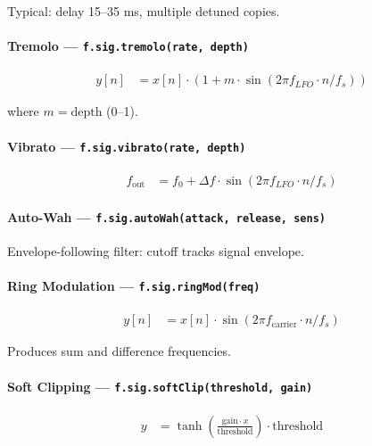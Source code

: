 Typical: delay 15--35 ms, multiple detuned copies.

\paragraph{Tremolo --- \texttt{f.sig.tremolo(rate, depth)}}

\begin{align}
y[n] &= x[n] \cdot (1 + m \cdot \sin(2\pi f_{LFO} \cdot n / f_s)) \label{eq:sig-tremolo}
\end{align}

where $m = \text{depth}$ (0--1).

\paragraph{Vibrato --- \texttt{f.sig.vibrato(rate, depth)}}

\begin{align}
f_{\text{out}} &= f_0 + \Delta f \cdot \sin(2\pi f_{LFO} \cdot n / f_s) \label{eq:sig-vibrato}
\end{align}

\paragraph{Auto-Wah --- \texttt{f.sig.autoWah(attack, release, sens)}}
Envelope-following filter: cutoff tracks signal envelope.

\paragraph{Ring Modulation --- \texttt{f.sig.ringMod(freq)}}

\begin{align}
y[n] &= x[n] \cdot \sin(2\pi f_{\text{carrier}} \cdot n / f_s) \label{eq:sig-ringmod}
\end{align}

Produces sum and difference frequencies.

\paragraph{Soft Clipping --- \texttt{f.sig.softClip(threshold, gain)}}

\begin{align}
y &= \tanh\left(\frac{\text{gain} \cdot x}{\text{threshold}}\right) \cdot \text{threshold} \label{eq:sig-softclip}
\end{align}

